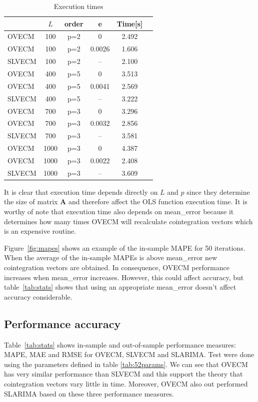 \begin{table}[h!]
\caption{Execution times}
\label{tab:extimes}
\begin{center}
\begin{tabular}{|l|c|c|c|c|c|}
\hline
& $L$ & order & e  & Time[s] \\
\hline
OVECM & 100 &p=2  & 0      & 2.492\\
OVECM & 100 &p=2  & 0.0026  & 1.606\\
SLVECM & 100 &p=2& -- & 2.100\\
\hline
OVECM & 400 & p=5  & 0      & 3.513\\
OVECM & 400 &p=5  & 0.0041  & 2.569\\
SLVECM & 400 & p=5 & -- & 3.222\\
\hline
OVECM & 700 &p=3  & 0      & 3.296\\
OVECM & 700 &p=3  & 0.0032  & 2.856\\
SLVECM & 700 &p=3 & -- & 3.581\\
\hline
OVECM & 1000 & p=3 & 0      & 4.387\\
OVECM & 1000 & p=3  & 0.0022  & 2.408\\
SLVECM & 1000 & p=3  & -- & 3.609\\
\hline
\end{tabular}
\end{center}
\end{table}

It is clear that execution time depends directly on $L$ and $p$ since they
determine the size of matrix $\mathbf{A}$ and therefore affect the OLS function
execution time.
It is worthy of note that execution time also depends on mean\_error because it
determines how many times OVECM will recalculate cointegration vectors which is
an expensive routine.

Figure~\ref{fig:mapes} shows an example of the in-sample MAPE for 50 iterations.
When the average of the in-sample MAPEs is above mean\_error new cointegration
vectors are obtained. In consequence, OVECM performance increases when
mean\_error increases. However, this could affect accuracy, but
table~\ref{tab:stats} shows that using an appropriate mean\_error doesn't affect
accuracy considerable. 

\subsection{Performance accuracy} \label{sec:performacc}

Table~\ref{tab:stats} shows in-sample and out-of-sample performance measures:
MAPE, MAE and RMSE for OVECM, SLVECM and SLARIMA. Test were done using the
parameters defined in table \ref{tab:52params}.  We can see that OVECM has very
similar performance than SLVECM and this support the theory that cointegration
vectors vary little in time. Moreover, OVECM also out performed SLARIMA based on
these three performance measures. 


